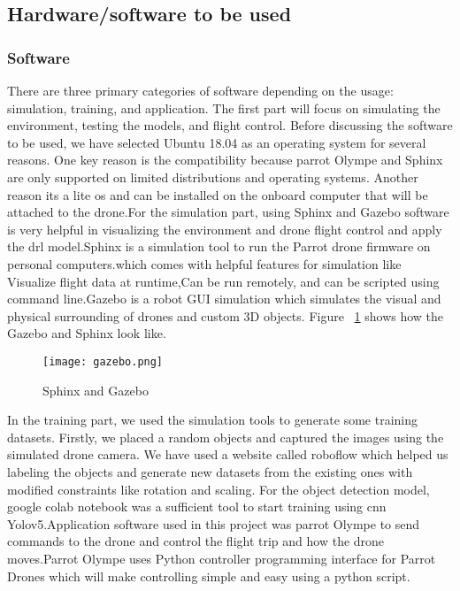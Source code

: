 \documentclass[../main.tex]{subfiles}
\begin{document}
\subsection{Hardware/software to be used}

\subsubsection{Software}
There are three primary categories of software depending on the usage: simulation, training, and application. The first part will focus on simulating the environment, testing the models, and flight control. Before discussing the software to be used, we have selected Ubuntu 18.04 as an operating system for several reasons. One key reason is the compatibility because parrot Olympe and Sphinx are only supported on limited distributions and operating systems. Another reason its a lite os and can be installed on the onboard computer that will be attached to the drone.For the simulation part, using Sphinx and Gazebo software is very helpful in visualizing the environment and drone flight control and apply the \gls{drl} model.Sphinx is a simulation tool to run the Parrot drone firmware on personal computers.which comes with helpful features for simulation like Visualize flight data at runtime,Can be run remotely, and can be scripted using command line.Gazebo is a robot GUI simulation which simulates the visual and physical surrounding of drones and custom 3D objects. Figure ~\ref{fig2:gazebo} shows how the Gazebo and Sphinx look like. \begin{figure}[H]
	\centering
	\texttt{[image: gazebo.png]}
	\caption{Sphinx and Gazebo }\label{fig2:gazebo}
\end{figure}
In the training part, we used the simulation tools to generate some training datasets. Firstly, we placed a random objects and captured the images using the simulated drone camera. We have used a website called roboflow which helped us labeling the objects and generate new datasets from the existing ones with modified constraints like rotation and scaling. For the object detection model, google colab notebook was a sufficient tool to start training using \gls{cnn} Yolov5.Application software used in this project was parrot Olympe to send commands to the drone and control the flight trip and how the drone moves.Parrot Olympe uses Python controller programming interface for Parrot Drones which will make controlling simple and easy using a python script.
\end{document}
